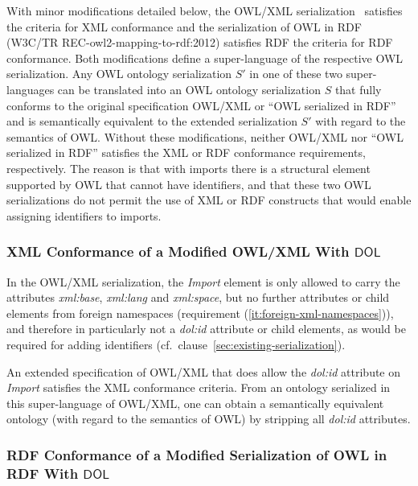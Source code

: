\documentclass[10pt,fleqn,final]{scrreprt}
\makeatletter
\newcommand*\CommentAuthor{}
\renewcommand*\CommentAuthor{#1}}
\newcommand*\CommentDate{}
\renewcommand*\CommentDate{#1}}
\newcommand*\CommentId{}
\renewcommand*\CommentId{#1}}
\newcommand*\CommentType{}
\renewcommand*\CommentType{#1}}
\newcommand*{\SetCommentColorByType}[1]{%
\edef\localType{{#1}}%
\expandafter\ifstrequal\localType{q-aut}{\colorlet{CommentColor}{red}}{%
\expandafter\ifstrequal\localType{q-all}{\colorlet{CommentColor}{orange}}{%
\expandafter\ifstrequal\localType{todo}{\colorlet{CommentColor}{orange}}{%
\expandafter\ifstrequal\localType{fyi}{\colorlet{CommentColor}{lightgray}}{%
\colorlet{CommentColor}{yellow}}}}}}
\newcommand*{\SetCommentPrefixByType}[1]{%
\edef\localType{{#1}}%
\expandafter\@ifmtarg\localType{%
\edef\CommentPrefix{}%
}{%
\caseupper[q]{#1}%
\edef\CommentPrefix{\thestring: }%
}}
\newcommand*{\initComment}[1]{%
\setkeys{Comment}{#1}%
\SetCommentColorByType{\CommentType}%
\relax%
\SetCommentPrefixByType{\CommentType}%
\relax%
}
\newcommand*{\todonote}[2][]{%
\initComment{#1}%
\pdfcomment[author=\CommentAuthor,color=CommentColor,date=\CommentDate,id=\CommentId]{%
\CommentPrefix
#2}}
\renewcommand*{\todonote}[2][]{%
\initComment{#1}%
\ednote{\CommentPrefix #2}}
\newcommand*{\CLnote}[2][author=Christoph Lange]{%
\todonote[author=Christoph Lange,#1]{#2} 
}
\newcommand*{\DOL}{\ensuremath{\mathsf{DOL}}\xspace}
\newcommand{\nisref}[1]{#1}
\newenvironment{definitions}[0]{\medskip }{}
\makeatother
\begin{document}
\begin{definitions}
With minor modifications detailed below, the OWL/XML serialization~\cite{W3C:REC-owl2-xml-serialization-20121211} satisfies the criteria for XML conformance and the serialization of OWL in RDF (\nisref{W3C/TR REC-owl2-mapping-to-rdf:2012}) satisfies RDF the criteria for RDF conformance. %
Both modifications define a super-language of the respective OWL serialization.
Any OWL ontology serialization $S'$ in one of these two super-languages can be translated into an OWL ontology serialization $S$ that fully conforms to the original specification OWL/XML or ``OWL serialized in RDF'' and is semantically equivalent to the extended serialization $S'$ with regard to the semantics of OWL.
Without these modifications, neither OWL/XML nor ``OWL serialized in RDF'' satisfies the XML or RDF conformance requirements, respectively.
The reason is that with imports there is a structural element supported by OWL that cannot have identifiers, and that these two OWL serializations do not permit the use of XML or RDF constructs that would enable assigning identifiers to imports.

\subsubsection{XML Conformance of a Modified OWL/XML With \DOL}

In the OWL/XML serialization, the \textit{Import} element is only allowed to carry the attributes \textit{xml:base}, \textit{xml:lang} and \textit{xml:space}, but no further attributes or child elements from foreign namespaces (requirement (\ref{it:foreign-xml-namespaces})), and therefore in particularly not a \textit{dol:id} attribute or child elements, as would be required for adding identifiers (cf.\ clause~\ref{sec:existing-serialization}).

An extended specification of OWL/XML that does allow the \textit{dol:id} attribute on \textit{Import} satisfies the XML conformance criteria.
From an ontology serialized in this super-language of OWL/XML, one can obtain a semantically equivalent ontology (with regard to the semantics of OWL) by stripping all \textit{dol:id} attributes.

\subsubsection{RDF Conformance of a Modified Serialization of OWL in RDF With \DOL}


\end{definitions}
\end{document}
